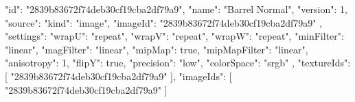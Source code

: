 {
  "id": "2839b83672f74deb30cf19cba2df79a9",
  "name": "Barrel Normal",
  "version": 1,
  "source": {
    "kind": "image",
    "imageId": "2839b83672f74deb30cf19cba2df79a9"
  },
  "settings": {
    "wrapU": "repeat",
    "wrapV": "repeat",
    "wrapW": "repeat",
    "minFilter": "linear",
    "magFilter": "linear",
    "mipMap": true,
    "mipMapFilter": "linear",
    "anisotropy": 1,
    "flipY": true,
    "precision": "low",
    "colorSpace": "srgb"
  },
  "textureIds": [
    "2839b83672f74deb30cf19cba2df79a9"
  ],
  "imageIds": [
    "2839b83672f74deb30cf19cba2df79a9"
  ]
}
